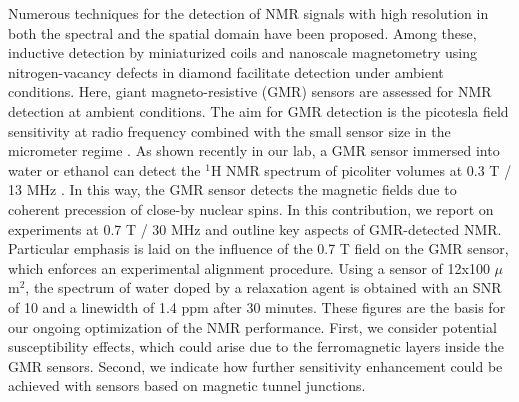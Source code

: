 Numerous techniques for the detection of NMR signals with high resolution in both the spectral and the spatial domain have been proposed. Among these, inductive detection by miniaturized coils \cite{Olson_1995} and nanoscale magnetometry using nitrogen-vacancy defects in diamond \cite{Wrachtrup_2016} facilitate detection under ambient conditions.
Here, giant magneto-resistive (GMR) sensors are assessed for NMR detection at ambient conditions. The aim for GMR detection is the picotesla field sensitivity at radio frequency combined with the small sensor size in the micrometer regime \cite{Freitas_2007,Fermon_2013}. As shown recently in our lab, a GMR sensor immersed into water or ethanol can detect the $^1$H NMR spectrum of picoliter volumes at 0.3 T / 13 MHz \cite{Guitard_2016}. In this way, the GMR sensor detects the magnetic fields due to coherent precession of close-by nuclear spins.
In this contribution, we report on experiments at 0.7 T / 30 MHz and outline key aspects of GMR-detected NMR. Particular emphasis is laid on the influence of the 0.7 T field on the GMR sensor, which enforces an experimental alignment procedure. Using a sensor of 12x100 $\mu$m$^2$, the spectrum of water doped by a relaxation agent is obtained with an SNR of 10 and a linewidth of 1.4 ppm after 30 minutes. These figures are the basis for our ongoing optimization of the NMR performance. First, we consider potential susceptibility effects, which could arise due to the ferromagnetic layers inside the GMR sensors. Second, we indicate how further sensitivity enhancement could be achieved with sensors based on magnetic tunnel junctions.